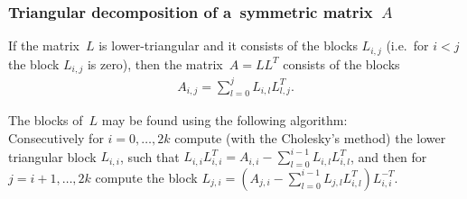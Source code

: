 \subsubsection*{Triangular decomposition of a~symmetric matrix~$A$}

If the matrix~$L$ is lower-triangular and it consists of the blocks
$L_{i,j}$ (i.e.\ for $i<j$ the block $L_{i,j}$ is zero),
then the matrix~$A=LL^T$ consists of the blocks
\begin{align*}
  A_{i,j} = \sum_{l=0}^jL_{i,l}L_{l,j}^T.
\end{align*}

The blocks of~$L$ may be found using the following algorithm: \\
Consecutively for $i=0,\ldots,2k$ compute (with the Cholesky's method)
the lower triangular block
$L_{i,i}$, such that $L_{i,i}L_{i,i}^T=A_{i,i}-\sum_{l=0}^{i-1}L_{i,l}L_{i,l}^T$,
and then for $j=i+1,\ldots,2k$ compute the block
$L_{j,i} = (A_{j,i}-\sum_{l=0}^{i-1}L_{j,l}L_{i,l}^T)L_{i,i}^{-T}$.

\vspace{\bigskipamount}

